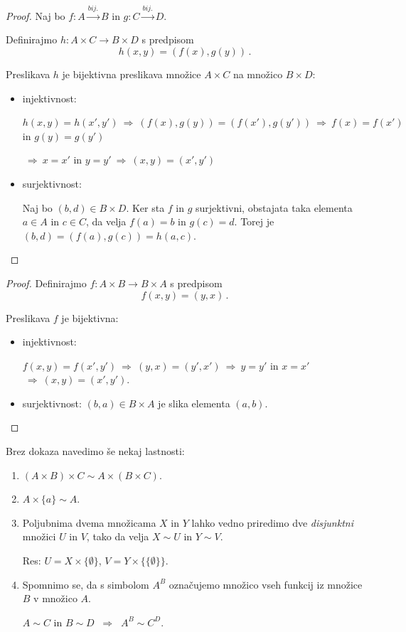 \documentclass[11pt,paper=b5,footinclude,headinclude]{scrbook} %
\def\sledi {{~\Rightarrow~}}
\begin{document}
\bigskip

\framebox{$A\sim B$ in $C\sim D$
$\sledi$ $A\times C\sim B\times D$}

\begin{proof} Naj bo $f:A\overset{bij.}{\to}B$ in $g:C\overset{bij.}{\to}D$.

Definirajmo $h:A\times C\to B \times D$ s predpisom
$$h(x,y) = (f(x),g(y))\,.$$

Preslikava $h$ je bijektivna preslikava množice $A\times C$ na množico $B\times D$:
\begin{itemize}
  \item injektivnost:

  $h(x,y) = h(x',y')\sledi
  (f(x),g(y)) = (f(x'),g(y')) \sledi f(x) = f(x')$ in $g(y) = g(y')$

  $\sledi x = x'$ in $y = y' \sledi (x,y) = (x',y')$
  \item surjektivnost:

  Naj bo $(b,d)\in B\times D$. Ker sta $f$ in $g$ surjektivni, obstajata taka elementa $a\in A$
  in $c\in C$, da velja $f(a) = b$ in $g(c) = d$. Torej je $(b,d) = (f(a),g(c)) = h(a,c)$.
\end{itemize}
\end{proof}

\bigskip

\newpage
{}


\begin{proof} Definirajmo  $f:A\times B\to B\times A$ s predpisom
$$f(x,y) = (y,x)\,.$$

Preslikava $f$ je bijektivna:
\begin{itemize}
  \item injektivnost:

  $f(x,y) = f(x',y') \sledi (y,x) = (y',x') \sledi y = y'$ in $x = x'$ $\sledi (x,y) = (x',y')$.

  \item surjektivnost: $(b,a)\in B\times A$ je slika elementa $(a,b)$.
\end{itemize}
\end{proof}

Brez dokaza navedimo še nekaj lastnosti:
\begin{enumerate}
  \item $(A\times B)\times C\sim A\times (B\times C)$.
  \item $A\times \{a\}\sim A$.
  \item Poljubnima dvema množicama $X$ in $Y$ lahko vedno priredimo dve {\em disjunktni} množici
  $U$ in $V$, tako da velja $X\sim U$ in $Y\sim V$.

  Res: $U = X\times\{\emptyset\}$, $V = Y\times\{\{\emptyset\}\}$.
  \item Spomnimo se, da s simbolom $A^B$ označujemo množico vseh funkcij iz množice $B$ v množico $A$.

  $A\sim C$ in $B\sim D$ $\sledi$ $A^B\sim C^D$.
\end{enumerate}
\end{document}
